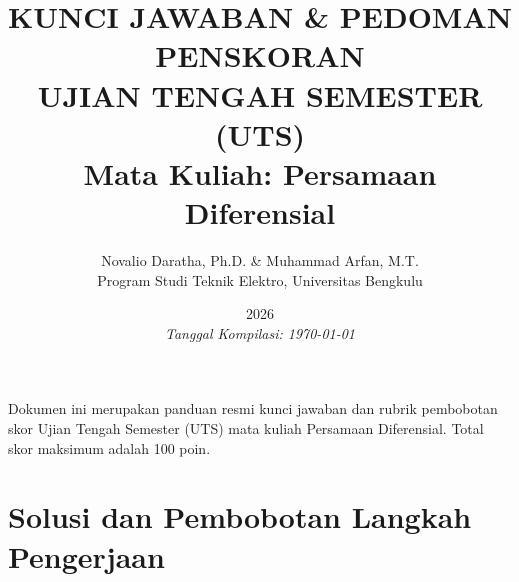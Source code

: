 \documentclass[11pt,a4paper]{article}
\title{\vspace{-2cm}\textbf{KUNCI JAWABAN \& PEDOMAN PENSKORAN\\UJIAN TENGAH SEMESTER (UTS)\\Mata Kuliah: Persamaan Diferensial}}
\author{Novalio Daratha, Ph.D. \& Muhammad Arfan, M.T.\\Program Studi Teknik Elektro, Universitas Bengkulu}
\date{2026 \\ \vspace{2mm}\small\textit{Tanggal Kompilasi: \today}}
\begin{document}
\maketitle

\begin{tcolorbox}[colback=blue!5!white,colframe=blue!75!black,title=Informasi Dosen \& Asisten]
Dokumen ini merupakan panduan resmi kunci jawaban dan rubrik pembobotan skor Ujian Tengah Semester (UTS) mata kuliah Persamaan Diferensial. Total skor maksimum adalah 100 poin.
\end{tcolorbox}

\section*{Solusi dan Pembobotan Langkah Pengerjaan}
\end{document}
